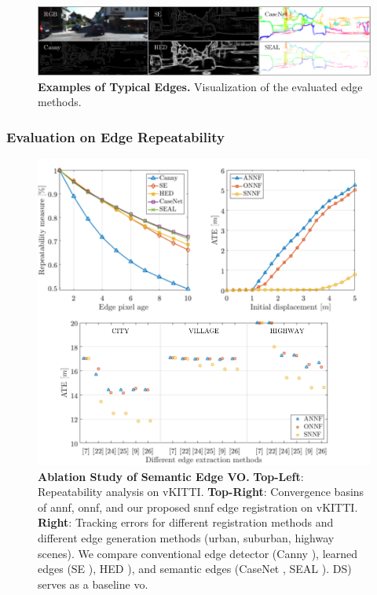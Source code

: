 \begin{figure}[t]
  	\centering
	\includegraphics[width=\linewidth]{figures/illumination/semantics_edges.pdf}
  	\caption[Examples of Typical Edges]{ \textbf{Examples of Typical Edges.} Visualization of the evaluated edge methods.
	\label{fig:semantics_edges}}
\end{figure}

\subsubsection{Evaluation on Edge Repeatability} 

\begin{figure}[t]
  	\centering
  	\includegraphics[width=0.8\linewidth]{figures/illumination/semantics_registration.pdf}
  	\caption[Ablation Study of Semantic Edge VO]{ \textbf{Ablation Study of Semantic Edge VO.} \textbf{Top-Left}: Repeatability analysis on vKITTI. \textbf{Top-Right}: Convergence basins of \acrshort{annf}, \acrshort{onnf}, and our proposed \acrshort{snnf} edge registration on vKITTI. \textbf{Right}: Tracking errors for different registration methods and different edge generation methods (urban, suburban,  highway scenes). We compare conventional edge detector (Canny \cite{canny1987computational}), learned edges (SE \cite{dollar2015fast}), HED \cite{xie2015holistically}), and semantic edges (CaseNet \cite{yu2017casenet}, SEAL \cite{yu2018simultaneous}). DS) \cite{engel2018direct} serves as a baseline \acrshort{vo}.
	\label{fig:semantics_registration}}
\end{figure}


